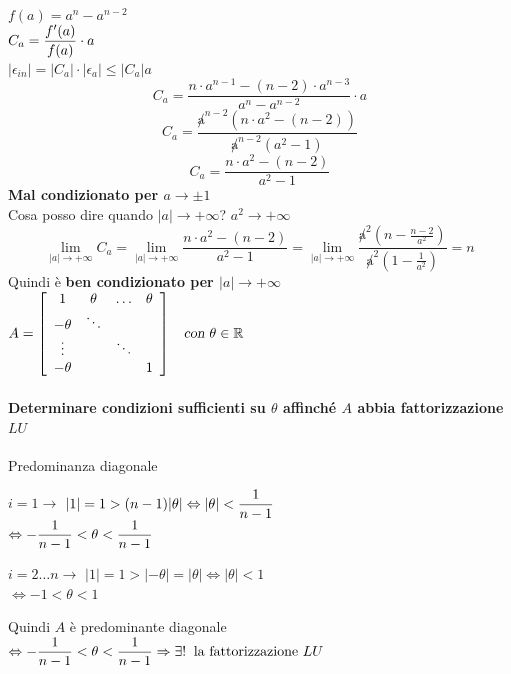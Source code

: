 \documentclass[10pt]{book}
\begin{document}
\paragraph{} $f(a) = a^n - a^{n-2}$\\
$C_a = \mathlarger{\frac{f'(a)}{f(a)}\cdot a}$\\
$|\epsilon_{in}| = |C_a|\cdot|\epsilon_a| \leq |C_a|a$
$$C_a = \frac{n\cdot a^{n-1} - (n-2)\cdot a^{n-3}}{a^n - a^{n-2}}\cdot a$$
$$C_a = \frac{\not a^{n-2}(n\cdot a^2 - (n-2))}{\not a^{n-2}(a^2 - 1)}$$
$$C_a = \frac{n\cdot a^2 - (n-2)}{a^2 - 1}$$
\textbf{Mal condizionato per $a\to\pm1$}\\
Cosa posso dire quando $|a| \to +\infty$? $a^2\to+\infty$\\
$$\lim_{|a|\to+\infty} C_a = \lim_{|a|\to+\infty} \frac{n\cdot a^2 - (n-2)}{a^2 - 1} = \lim_{|a|\to+\infty} \frac{\not a^2(n - \frac{n-2}{a^2})}{\not a^2(1 - \frac{1}{a^2})} = n$$
Quindi è \textbf{ben condizionato per $|a|\to+\infty$}
\begin{math}
A = \left[ 
\begin{array}{c c c c}
1 & \theta & \ldots & \theta \\
-\theta & \ddots & &\\
\vdots & & \ddots &\\
-\theta & & & 1
\end{array}
\right]
\:\:\:\:\textsl{con }\theta\in \mathbb{R}
\end{math}
\paragraph{Determinare condizioni sufficienti su $\theta$ affinché $A$ abbia fattorizzazione $LU$} Predominanza diagonale
\begin{list}{}{}
	\item[$i = 1 \rightarrow$] $|1| = 1 > (n-1)|\theta| \Leftrightarrow |\theta| < \mathlarger{\frac{1}{n-1}}$\\
$\Leftrightarrow \mathlarger{-\frac{1}{n-1} < \theta < \frac{1}{n-1}}$
\item[$i = 2\ldots n \rightarrow$] $|1| = 1 > |-\theta| = |\theta| \Leftrightarrow |\theta| < 1$\\ 
$\Leftrightarrow -1 < \theta < 1 $
\end{list}
Quindi $A$ è predominante diagonale $\Leftrightarrow \mathlarger{-\frac{1}{n-1} < \theta < \frac{1}{n-1}} \Rightarrow \exists!\: \text{ la fattorizzazione }LU$
\end{document}
